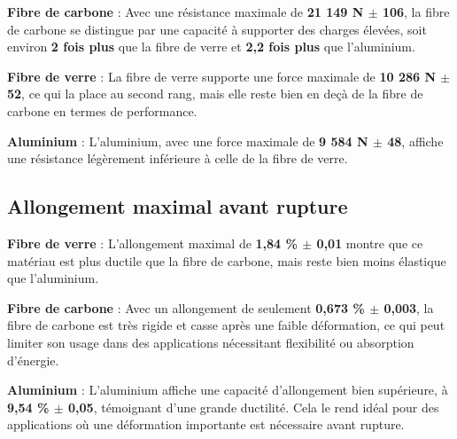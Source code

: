 \textbf{Fibre de carbone} : Avec une résistance maximale de \textbf{21 149 N $\pm$ 106}, la fibre de carbone se distingue par une capacité à supporter des charges élevées, soit environ \textbf{2 fois plus} que la fibre de verre et \textbf{2,2 fois plus} que l’aluminium.

\textbf{Fibre de verre} : La fibre de verre supporte une force maximale de \textbf{10 286 N $\pm$ 52}, ce qui la place au second rang, mais elle reste bien en deçà de la fibre de carbone en termes de performance.

\textbf{Aluminium} : L’aluminium, avec une force maximale de \textbf{9 584 N $\pm$ 48}, affiche une résistance légèrement inférieure à celle de la fibre de verre.

\subsection{Allongement maximal avant rupture}

\textbf{Fibre de verre} : L’allongement maximal de \textbf{1,84 \% $\pm$ 0,01} montre que ce matériau est plus ductile que la fibre de carbone, mais reste bien moins élastique que l’aluminium.

\textbf{Fibre de carbone} : Avec un allongement de seulement \textbf{0,673 \% $\pm$ 0,003}, la fibre de carbone est très rigide et casse après une faible déformation, ce qui peut limiter son usage dans des applications nécessitant flexibilité ou absorption d’énergie.

\textbf{Aluminium} : L’aluminium affiche une capacité d’allongement bien supérieure, à \textbf{9,54 \% $\pm$ 0,05}, témoignant d’une grande ductilité. Cela le rend idéal pour des applications où une déformation importante est nécessaire avant rupture.


